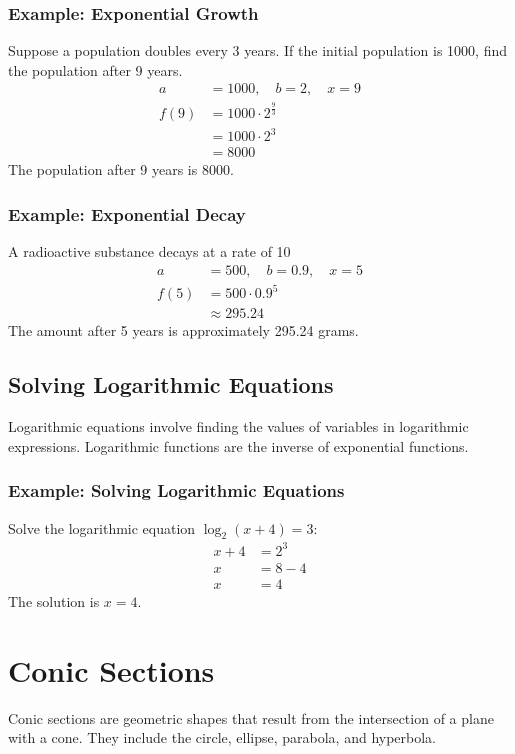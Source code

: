 \documentclass{article}
\begin{document}
\subsubsection{Example: Exponential Growth}
Suppose a population doubles every 3 years. If the initial population is 1000, find the population after 9 years.
\begin{align*}
    a &= 1000, \quad b = 2, \quad x = 9 \\
    f(9) &= 1000 \cdot 2^{\frac{9}{3}} \\
    &= 1000 \cdot 2^3 \\
    &= 8000
\end{align*}
The population after 9 years is 8000.

\subsubsection{Example: Exponential Decay}
A radioactive substance decays at a rate of 10%
\begin{align*}
    a &= 500, \quad b = 0.9, \quad x = 5 \\
    f(5) &= 500 \cdot 0.9^5 \\
    &\approx 295.24
\end{align*}
The amount after 5 years is approximately 295.24 grams.

\subsection{Solving Logarithmic Equations}
Logarithmic equations involve finding the values of variables in logarithmic expressions. Logarithmic functions are the inverse of exponential functions.

\subsubsection{Example: Solving Logarithmic Equations}
Solve the logarithmic equation $\log_2(x + 4) = 3$:
\begin{align*}
    x + 4 &= 2^3 \\
    x &= 8 - 4 \\
    x &= 4
\end{align*}
The solution is $x = 4$.

\section{Conic Sections}
Conic sections are geometric shapes that result from the intersection of a plane with a cone. They include the circle, ellipse, parabola, and hyperbola.
\end{document}
